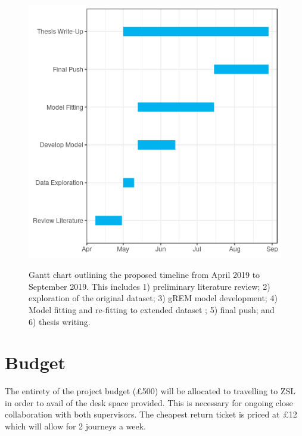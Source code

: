\documentclass[11pt]{article}
\begin{document}
\begin{figure}[H]
	\includegraphics[height = 12cm, width=14cm]{../Data/gantt.png}
	\caption{Gantt chart outlining the proposed timeline from April 2019 to September 2019. This includes 1) preliminary literature review; 2) exploration of the original dataset; 3) gREM model development; 4) Model fitting and re-fitting to extended dataset ; 5) final push; and 6) thesis writing.}
\end{figure}

\section{Budget}
The entirety of the project budget (£500) will be allocated to travelling to ZSL in order to avail of the desk space provided. This is necessary for ongoing close collaboration with both supervisors.
The cheapest return ticket is priced at £12 which will allow for 2 journeys a week.





\end{document}
